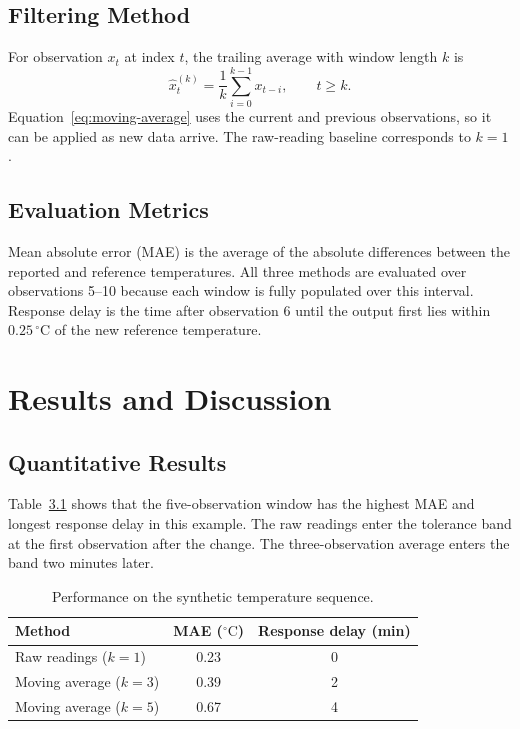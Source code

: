 \documentclass[12pt,a4paper]{report}
\begin{document}
\section{Filtering Method}

For observation \(x_t\) at index \(t\), the trailing average with window
length \(k\) is
\begin{equation}
  \widehat{x}^{(k)}_t = \frac{1}{k}\sum_{i=0}^{k-1} x_{t-i},
  \qquad t \geq k.
  \label{eq:moving-average}
\end{equation}
Equation~\eqref{eq:moving-average} uses the current and previous
observations, so it can be applied as new data arrive. The raw-reading
baseline corresponds to \(k=1\).

\section{Evaluation Metrics}

Mean absolute error (MAE) is the average of the absolute differences
between the reported and reference temperatures. All three methods
are evaluated over observations 5--10 because each window is fully
populated over this interval. Response delay is the time after
observation 6 until the output first lies within
\(0.25\,^{\circ}\mathrm{C}\) of the new reference temperature.

\chapter{Results and Discussion}

\section{Quantitative Results}

Table~\ref{tab:results} shows that the five-observation window has the
highest MAE and longest response delay in this example. The raw
readings enter the tolerance band at the first observation after the
change. The three-observation average enters the band two minutes later.

\begin{table}[htbp]
  \centering
  \caption{Performance on the synthetic temperature sequence.}
  \label{tab:results}
  \begin{tabular}{@{}lcc@{}}
    \toprule
    Method & MAE (\(^{\circ}\mathrm{C}\)) & Response delay (min) \\
    \midrule
    Raw readings (\(k=1\))    & 0.23 & 0 \\
    Moving average (\(k=3\))  & 0.39 & 2 \\
    Moving average (\(k=5\))  & 0.67 & 4 \\
    \bottomrule
  \end{tabular}
\end{table}
\end{document}
